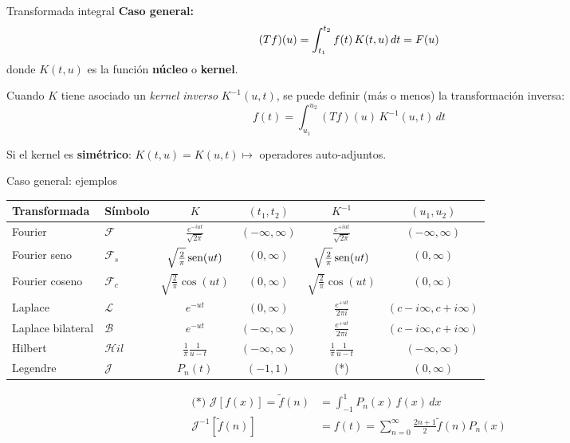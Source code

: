 \documentclass[9pt, aspectratio=169]{beamer}
\begin{document}
\begin{frame}{Transformada integral}
	\textbf{Caso general:}
	\[ (Tf)(u) = \int_{t_1}^{t_2} f(t) \, K(t, u) \, dt \\ = F(u) \]
	donde $K(t, u)$ es la función \textbf{núcleo} o \textbf{kernel}.

	Cuando $K$ tiene asociado un \textit{kernel inverso} $K^{-1}(u, t)$, se puede definir (más o menos) la transformación inversa:
	\[ f(t) = \int_{u_1}^{u_2} (Tf)(u) \, K^{-1}(u, t) \, dt \]

	Si el kernel es \textbf{simétrico}: $K(t, u) = K(u, t) \mapsto$ operadores auto-adjuntos.

\end{frame}

\begin{frame}{Caso general: ejemplos}

	\begin{center}
		\begin{tabular}{llcccc}
			\toprule
			\textbf{Transformada} & \textbf{Símbolo} & $K$                             & $(t_1, t_2)$        & $K^{-1}$                        & $(u_1, u_2)$             \\
			\midrule
			Fourier               & $\mathscr{F}$    & $\frac{e^{-iut}}{\sqrt{2 \pi}}$ & $(-\infty, \infty)$ & $\frac{e^{+iut}}{\sqrt{2 \pi}}$ & $(-\infty, \infty)$      \\
			Fourier seno          & $\mathscr{F}_s$  & $\sqrt{\frac{2}{\pi}} \operatorname{sen}(ut)$ & $(0, \infty)$       & $\sqrt{\frac{2}{\pi}} \operatorname{sen}(ut)$ & $(0, \infty)$            \\
			Fourier coseno        & $\mathscr{F}_c$  & $\sqrt{\frac{2}{\pi}} \cos(ut)$ & $(0, \infty)$       & $\sqrt{\frac{2}{\pi}} \cos(ut)$ & $(0, \infty)$            \\
			Laplace               & $\mathscr{L}$    & $e^{-ut}$                       & $(0, \infty)$       & $\frac{e^{+ut}}{2 \pi i}$       & $(c-i\infty, c+i\infty)$ \\
			Laplace bilateral     & $\mathscr{B}$    & $e^{-ut}$                       & $(-\infty, \infty)$ & $\frac{e^{+ut}}{2 \pi i}$       & $(c-i\infty, c+i\infty)$ \\
			Hilbert               & $\mathcal{H}il$  & $\frac{1}{\pi} \frac{1}{u-t}$   & $(-\infty, \infty)$ & $\frac{1}{\pi} \frac{1}{u-t}$   & $(-\infty, \infty)$      \\
			Legendre              & $\mathcal{J}$    & $P_n(t)$                        & $(-1, 1)$           & (*)                             & $(0, \infty)$            \\
			\bottomrule
		\end{tabular}
	\end{center}
	\begin{align*}
		\text{(*) }\mathcal{J}[f(x)] = \tilde{f}(n) & = \int_{-1}^{1} P_n(x) \, f(x) \, dx                                 \\
		\mathcal{J}^{-1}[\tilde{f}(n)]              & = f(t) = \sum_{n = 0}^{\infty} \frac{2 n + 1}{2} \tilde{f}(n) P_n(x)
	\end{align*}
\end{frame}
\end{document}
